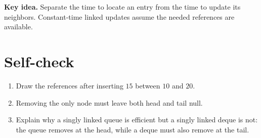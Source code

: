 \documentclass[11pt,letterpaper]{article}
\newcommand{\keyidea}[1]{\par\textbf{Key idea.} #1\par}
\begin{document}
\keyidea{Separate the time to locate an entry from the time to update its neighbors. Constant-time linked updates assume the needed references are available.}

\section{Self-check}
\begin{enumerate}
\item Draw the references after inserting $15$ between $10$ and $20$.
\item Removing the only node must leave both head and tail null.
\item Explain why a singly linked queue is efficient but a singly linked deque is not: the queue removes at the head, while a deque must also remove at the tail.
\end{enumerate}
\end{document}
